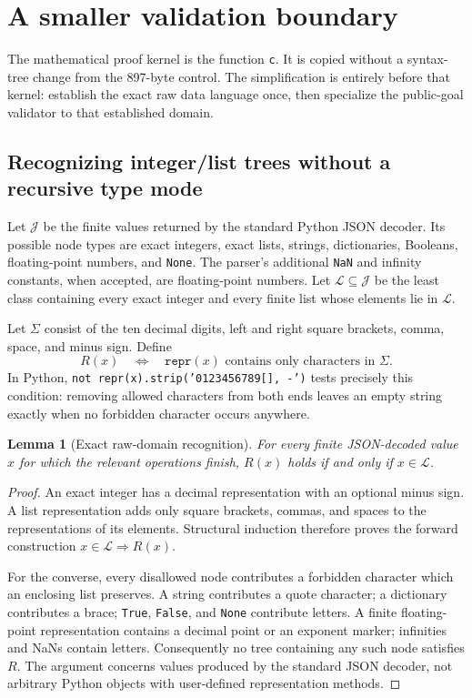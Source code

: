\documentclass[11pt,letterpaper]{article}
\newtheorem{lemma}[theorem]{Lemma}
\theoremstyle{definition}
\theoremstyle{remark}
\begin{document}


\section{A smaller validation boundary}
\label{sec:validation-proof}
The mathematical proof kernel is the function \texttt{c}. It is copied
without a syntax-tree change from the 897-byte control. The simplification
is entirely before that kernel: establish the exact raw data language once,
then specialize the public-goal validator to that established domain.

\subsection{Recognizing integer/list trees without a recursive type mode}
Let $\mathcal J$ be the finite values returned by the standard Python JSON
decoder. Its possible node types are exact integers, exact lists, strings,
dictionaries, Booleans, floating-point numbers, and \texttt{None}.
The parser's additional \texttt{NaN} and infinity constants, when accepted,
are floating-point numbers. Let $\mathcal L\subseteq\mathcal J$ be the
least class containing every exact integer and every finite list whose
elements lie in $\mathcal L$.

Let $\Sigma$ consist of the ten decimal digits, left and right square
brackets, comma, space, and minus sign. Define
\[
 R(x)\quad\Longleftrightarrow\quad
 \texttt{repr}(x)\text{ contains only characters in }\Sigma.
\]
In Python, \texttt{not repr(x).strip('0123456789[], -')} tests precisely
this condition: removing allowed characters from both ends leaves an
empty string exactly when no forbidden character occurs anywhere.

\begin{lemma}[Exact raw-domain recognition]
\label{lem:repr}
For every finite JSON-decoded value $x$ for which the relevant operations
finish, $R(x)$ holds if and only if $x\in\mathcal L$.
\end{lemma}
\begin{proof}
An exact integer has a decimal representation with an optional minus sign.
A list representation adds only square brackets, commas, and spaces to
the representations of its elements. Structural induction therefore proves
the forward construction $x\in\mathcal L\Rightarrow R(x)$.

For the converse, every disallowed node contributes a forbidden character
which an enclosing list preserves. A string contributes a quote character;
a dictionary contributes a brace; \texttt{True}, \texttt{False}, and
\texttt{None} contribute letters. A finite floating-point representation
contains a decimal point or an exponent marker; infinities and NaNs contain
letters. Consequently no tree containing any such node satisfies $R$.
The argument concerns values produced by the standard JSON decoder, not
arbitrary Python objects with user-defined representation methods.
\end{proof}
\end{document}
